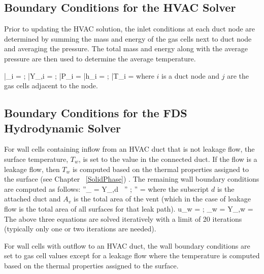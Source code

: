 \subsection{Boundary Conditions for the HVAC Solver}

Prior to updating the HVAC solution, the inlet conditions at each duct node are determined by summing the mass and energy of the gas cells next to duct node and averaging the pressure.  The total mass and energy along with the average pressure are then used to determine the average temperature.


\be \bar{\rho}_i =   \quad ; \quad
    \bar{Y}_{\alpha,i} =   \quad ; \quad
    \bar{P}_i =   \ee
\be \bar{h}_i =   \quad ; \quad
    \bar{T}_i =  \ee
where $i$ is a duct node and $j$ are the gas cells adjacent to the node.

\subsection{Boundary Conditions for the FDS Hydrodynamic Solver}

For wall cells containing inflow from an HVAC duct that is not leakage flow, the surface temperature, $T_w$, is set to the value in the connected duct.  If the flow is a leakage flow, then $T_w$ is computed based on the thermal properties assigned to the surface (see Chapter ~\ref{SolidPhase}) .  The remaining wall boundary conditions are computed as follows:
\be
   ''_{\alpha} = Y_{\alpha,d} \, '' \quad ; \quad {}'' = 
\ee
where the subscript $d$ is the attached duct and $A_v$ is the total area of the vent (which in the case of leakage flow is the total area of all surfaces for that leak path).
\be
   u_w =  \quad ; \quad \rho_w = 
\ee
\be
   Y_{\alpha,w} = 
\ee
The above three equations are solved iteratively with a limit of 20 iterations (typically only one or two iterations are needed).

For wall cells with outflow to an HVAC duct, the wall boundary conditions are set to gas cell values except for a leakage flow where the temperature is computed based on the thermal properties assigned to the surface.

